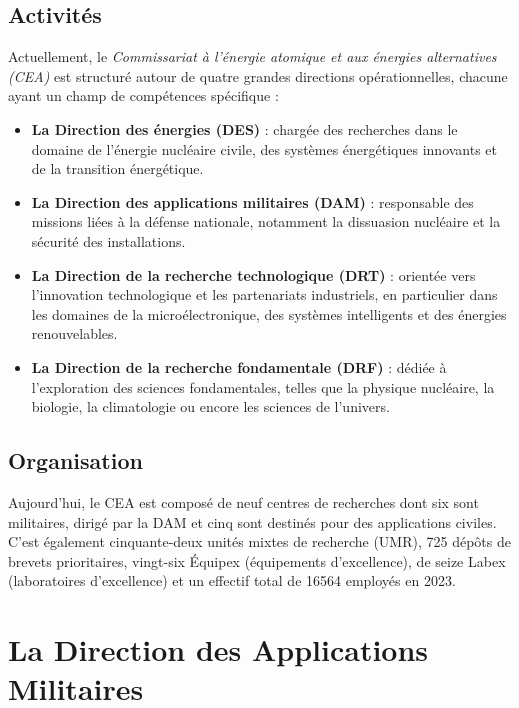 \documentclass[12pt,a4paper]{report}
\begin{document}
\subsection{Activités}
Actuellement, le \textit{Commissariat à l'énergie atomique et aux énergies alternatives (CEA)} est structuré autour de quatre grandes directions opérationnelles, chacune ayant un champ de compétences spécifique :

\begin{itemize}
  \item \textbf{La Direction des énergies (DES)} : chargée des recherches dans le domaine de l’énergie nucléaire civile, des systèmes énergétiques innovants et de la transition énergétique.
  
  \item \textbf{La Direction des applications militaires (DAM)} : responsable des missions liées à la défense nationale, notamment la dissuasion nucléaire et la sécurité des installations.

  \item \textbf{La Direction de la recherche technologique (DRT)} : orientée vers l’innovation technologique et les partenariats industriels, en particulier dans les domaines de la microélectronique, des systèmes intelligents et des énergies renouvelables.

  \item \textbf{La Direction de la recherche fondamentale (DRF)} : dédiée à l’exploration des sciences fondamentales, telles que la physique nucléaire, la biologie, la climatologie ou encore les sciences de l’univers.
\end{itemize}

\subsection{Organisation}
Aujourd'hui, le CEA est composé de neuf centres de recherches dont six sont militaires, dirigé par la DAM et cinq sont destinés pour des applications civiles. C'est également cinquante-deux unités mixtes de recherche (UMR), 725 dépôts de brevets prioritaires, vingt-six Équipex (équipements d'excellence), de seize Labex (laboratoires d'excellence) et un effectif total de 16564 employés en 2023.


\section{La Direction des Applications Militaires}
\end{document}
